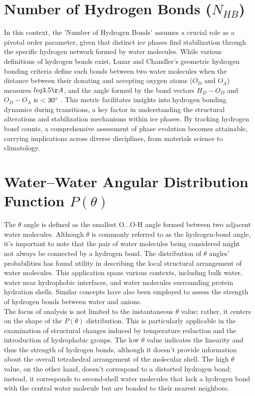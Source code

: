 \section{Number of Hydrogen Bonds ($N_{HB}$)}
In this context, the 'Number of Hydrogen Bonds' assumes a crucial role as a pivotal order parameter, given that distinct ice phases find stabilization through the specific hydrogen network formed by water molecules. While various definitions of hydrogen bonds exist, Luzar and Chandler's geometric hydrogen bonding criteria define such bonds between two water molecules when the distance between their donating and accepting oxygen atoms ($O_D$ and $O_A$) measures $leq 3.5 \AA$, and the angle formed by the bond vectors $H_D-O_D$ and $O_D-O_A$ is $ < 30\degree$ \cite{Luzar1996} \cite{Luzar1996_1}. This metric facilitates insights into hydrogen bonding dynamics during transitions, a key factor in understanding the structural alterations and stabilization mechanisms within ice phases. By tracking hydrogen bond counts, a comprehensive assessment of phase evolution becomes attainable, carrying implications across diverse disciplines, from materials science to climatology.

\section{Water–Water Angular Distribution Function $P(\theta)$}
The $\theta$ angle is defined as the smallest O...O-H angle formed between two adjacent water molecules. Although $\theta$ is commonly referred to as the hydrogen-bond angle, it's important to note that the pair of water molecules being considered might not always be connected by a hydrogen bond\cite{Sharp2009}. The distribution of $\theta$ angles' probabilities has found utility in describing the local structural arrangement of water molecules. This application spans various contexts, including bulk water, water near hydrophobic interfaces, and water molecules surrounding protein hydration shells. Similar concepts have also been employed to assess the strength of hydrogen bonds between water and anions\cite{Stirnemann2013}.\\

The focus of analysis is not limited to the instantaneous $\theta$ value; rather, it centers on the shape of the $P(\theta)$ distribution. This is particularly applicable in the examination of structural changes induced by temperature reduction and the introduction of hydrophobic groups\cite{Sharp2001}.
The low $\theta$ value indicates the linearity and thus the strength of hydrogen bonds, although it doesn't provide information about the overall tetrahedral arrangement of the molecular shell. The high $\theta$ value, on the other hand, doesn't correspond to a distorted hydrogen bond; instead, it corresponds to second-shell water molecules that lack a hydrogen bond with the central water molecule but are bonded to their nearest neighbors.

